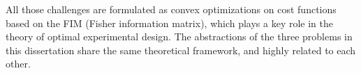     All those challenges are formulated as convex optimizations on cost functions based on the FIM (Fisher information matrix), which plays a key role in the theory of optimal experimental design. The abstractions of the three problems in this dissertation share the same theoretical framework, and highly related to each other.

